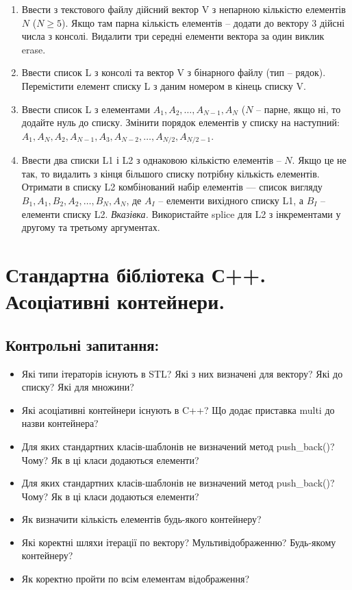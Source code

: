 \documentclass[a5paper,titlepage,openany,twoside,
]
{book_unv}%
\begin{document}
\begin{enumerate}
\begin{enumerate}
\begin{enumerate}
\item
Ввести з текстового файлу дійсний вектор V з непарною кількістю елементів $N$ ($N \ge 5$).
Якщо там парна кількість елементів -- додати до вектору 3 дійсні числа з консолі.
Видалити три середні елементи вектора за один виклик erase.

\item
Ввести список L з консолі та вектор V з бінарного файлу (тип -- рядок). 
Перемістити елемент списку L з даним номером в кінець списку V.

\item
Ввести список L з елементами $A_1,A_2, \ldots, A_{N-1}, A_N$ ($N$ -- парне,
якщо ні, то додайте нуль до списку.
Змінити порядок елементів у списку на наступний: $A_1, A_N,
A_{2}, A_{N-1}, A_3, A_{N-2}, \ldots, A_{N/2}, A_{N/2-1}$.

\item
Ввести два списки L1 і L2 з однаковою кількістю елементів -- $N$.
Якщо це не так, то видалить з кінця більшого списку потрібну кількість
елементів. Отримати в списку L2 комбінований набір  елементів ---
список вигляду $B_1, A_1, B_2, A_2,\ldots, B_N, A_ N$, де $A_I$ --
елементи вихідного списку L1, а $B_I$ -- елементи списку L2.
\emph{Вказівка.} Використайте splice для L2 з інкрементами у другому та третьому аргументах. 
\end{enumerate}


\chapter{Стандартна бібліотека С++. Асоціативні контейнери.}
%

\section{Контрольні запитання:}
\begin{itemize}
\item
Які типи ітераторів існують в STL? Які з них визначені для вектору? Які
до списку? Які для множини?
\item
Які асоціативні контейнери існують в C++? Що додає приставка multi до
назви контейнера?
\item
Для яких стандартних класів-шаблонів не визначений метод push\_back()?
Чому? Як в ці класи додаються елементи?
\item
Для яких стандартних класів-шаблонів не визначений метод push\_back()?
Чому? Як в ці класи додаються елементи?
\item
Як визначити кількість елементів будь-якого контейнеру?
\item
Які коректні шляхи ітерації по вектору? Мультивідображенню? Будь-якому
контейнеру?
\item
Як коректно пройти по всім елементам відображення?
\end{itemize}


\end{enumerate}
\end{enumerate}
\end{document}
